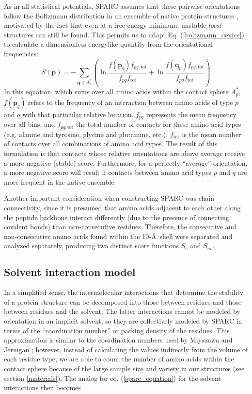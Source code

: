 \documentclass[11pt,titlepage]{article}
\begin{document}
As in all statistical potentials, SPARC assumes that these pairwise orientations follow the Boltzmann distribution in an ensemble of native protein structures \cite{sippl}, motivated by the fact that even at a free energy minimum, unstable \textit{local} structures can still be found.
This permits us to adapt Eq. (\ref{boltzmann_device}) to calculate a dimensionless energylike quantity from the orientational frequencies:
\begin{equation}
\displaystyle
S(\textbf{p}) = -\sum_{\textbf{q}\in A_p^*} \left(\ln{\frac{f(\textbf{p}_q)f_{pq,\text{tot}}}{\bar{f}_{pq}\bar{f}_\text{tot}}} + \ln{\frac{f(\textbf{q}_p)f_{pq,\text{tot}}}{\bar{f}_{pq}\bar{f}_\text{tot}}}\right)
\label{sparc_equation}
\end{equation}
In this equation, which sums over all amino acids within the contact sphere $A_p^*$, $f(\textbf{p}_q)$ refers to the frequency of an interaction between amino acids of type $p$ and $q$ with that particular relative location. 
$\bar{f}_{pq}$ represents the mean frequency over all bins, and $f_{pq,\text{tot}}$ the total number of contacts for these amino acid types (e.g. alanine and tyrosine, glycine and glutamine, etc.).
$\bar{f}_\text{tot}$ is the mean number of contacts over all combinations of amino acid types.
The result of this formulation is that contacts whose relative orientations are above average receive a more negative (stable) score.
Furthermore, for a perfectly ``average'' orientation, a more negative score will result if contacts between amino acid types $p$ and $q$ are more frequent in the native ensemble.

Another important consideration when constructing SPARC was chain connectivity, since it is presumed that amino acids adjacent to each other along the peptide backbone interact differently (due to the presence of connecting covalent bonds) than non-consecutive residues.
Therefore, the consecutive and non-consecutive amino acids found within the 10-\AA\, shell were separated and analyzed separately, producing two distinct score functions $S_c$ and $S_{nc}$.

\subsection{Solvent interaction model}
In a simplified sense, the intermolecular interactions that determine the stability of a protein structure can be decomposed into those between residues and those between residues and the solvent.
The latter interactions cannot be modeled by orientation in an implicit solvent, so they are collectively modeled by SPARC in terms of the ``coordination number'' or packing density of the residues.
This approximation is similar to the coordination numbers used by Miyazawa and Jernigan \cite{miyazawa}; however, instead of calculating the values indirectly from the volume of each residue type, we are able to count the number of amino acids within the contact sphere because of the large sample size and variety in our structures (see section \ref{materials}).
The analog for eq. (\ref{sparc_equation}) for the solvent interactions then becomes
\end{document}
